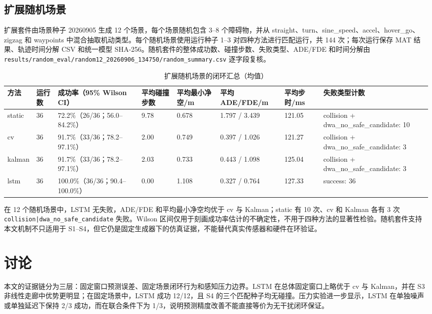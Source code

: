 \documentclass[10pt,a4paper,twocolumn]{ctexart}
\begin{document}
\subsection{扩展随机场景}

扩展套件由场景种子 20260905 生成 12 个场景，每个场景随机包含 3–8 个障碍物，并从 straight、turn、sine\_speed、accel、hover\_go、zigzag 和 waypoints 中混合抽取机动类型。每个随机场景使用运行种子 1–3 对四种方法进行匹配运行，共 144 次；每次运行保存 MAT 结果、轨迹时间分解 CSV 和统一模型 SHA-256。随机套件的整体成功数、碰撞步数、失败类型、ADE/FDE 和时间分解由 \texttt{results/random\_eval/random12\_20260906\_134750/random\_summary.csv} 逐字段复核。

\begin{table}[t]
\centering
\small
\caption{扩展随机场景的闭环汇总（均值）}
\label{tab:table-9}
\begin{tabularx}{\textwidth}{YYYYYYYY}
\toprule
方法 & 运行数 & 成功率（95\% Wilson CI） & 平均碰撞步数 & 平均最小净空/m & 平均 ADE/FDE/m & 平均步时/ms & 失败类型计数 \\
\midrule
static & 36 & 72.2\%（26/36；56.0–84.2\%） & 9.78 & 0.678 & 1.797 / 3.439 & 121.05 & collision + dwa\_no\_safe\_candidate: 10 \\
cv & 36 & 91.7\%（33/36；78.2–97.1\%） & 2.00 & 0.749 & 0.397 / 1.026 & 121.27 & collision + dwa\_no\_safe\_candidate: 3 \\
kalman & 36 & 91.7\%（33/36；78.2–97.1\%） & 2.03 & 0.733 & 0.443 / 1.098 & 125.04 & collision + dwa\_no\_safe\_candidate: 3 \\
lstm & 36 & 100.0\%（36/36；90.4–100.0\%） & 0.00 & 1.108 & 0.327 / 0.764 & 127.33 & success: 36 \\
\bottomrule
\end{tabularx}
\end{table}

在 12 个随机场景中，LSTM 无失败，ADE/FDE 和平均最小净空均优于 cv 与 Kalman；static 有 10 次、cv 和 Kalman 各有 3 次 \texttt{collision|dwa\_no\_safe\_candidate} 失败。Wilson 区间仅用于刻画成功率估计的不确定性，不用于四种方法的显著性检验。随机套件支持本文机制不只适用于 S1–S4，但它仍是固定生成器下的仿真证据，不能替代真实传感器和硬件在环验证。

\section{讨论}

本文的证据链分为三层：固定窗口预测误差、固定场景闭环行为和感知压力边界。LSTM 在总体固定窗口上略优于 cv 与 Kalman，并在 S3 非线性走廊中优势更明显；在固定场景中，LSTM 成功 12/12，且 S4 的三个匹配种子均无碰撞。压力实验进一步显示，LSTM 在单独噪声或单独延迟下保持 2/3 成功，而在联合条件下为 1/3，说明预测精度改善不能直接等价为无干扰闭环保证。
\end{document}
